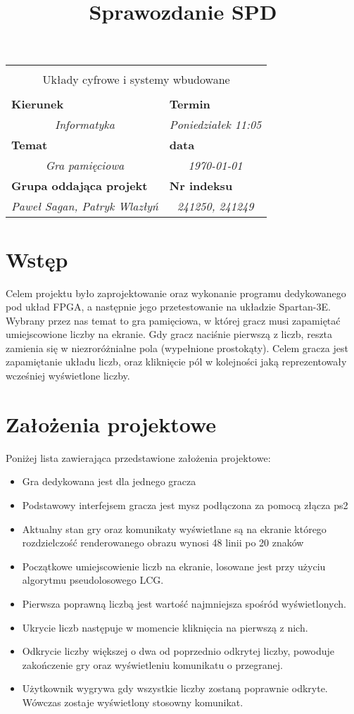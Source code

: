 \documentclass[polish,polish,a4paper]{article}
\title{Sprawozdanie SPD}
\newcommand{\name}[1]{\sffamily\bfseries\scriptsize #1}
\newcommand{\frontpage}[8]{

\vspace{2cm}

\begin{tabular}{|p{0.72\textwidth}|p{0.28\textwidth}|}
\hline
\multicolumn{2}{|c|}{}\\
\multicolumn{2}{|c|}{{\LARGE #1}}\\
\multicolumn{2}{|c|}{}\\
\hline
\name{Kierunek} & \name{Termin}\\
\multicolumn{1}{|c|}{\textit{#2}} & \multicolumn{1}{|c|}{\textit{#3}} \\
\hline
\name{Temat} & \name{data}\\
\multicolumn{1}{|c|}{\textit{#4}} & \multicolumn{1}{|c|}{\textit{#5}} \\
\hline
\name{Grupa oddająca projekt} & \name{Nr indeksu}\\
\multicolumn{1}{|c|}{\textit{#6}} & \multicolumn{1}{|c|}{\textit{#7}} \\
\hline
\end{tabular}
}
\begin{document}
\frontpage{Układy cyfrowe i systemy wbudowane}{Informatyka}{Poniedziałek 11:05}{Gra pamięciowa}{\today}{Paweł Sagan, Patryk Wlazłyń}{241250, 241249}
\pagestyle{}
\newpage
\tableofcontents
\newpage
\section{Wstęp}
Celem projektu było zaprojektowanie oraz wykonanie programu dedykowanego pod układ FPGA, a następnie jego przetestowanie na układzie Spartan-3E.
Wybrany przez nas temat to gra pamięciowa, w której gracz musi zapamiętać umiejscowione liczby na ekranie.
Gdy gracz naciśnie pierwszą z liczb, reszta zamienia się w niezroróżnialne pola (wypełnione prostokąty).
Celem gracza jest zapamiętanie układu liczb, oraz kliknięcie pól w kolejności jaką reprezentowały wcześniej wyświetlone liczby.

\section{Założenia projektowe}
Poniżej lista zawierająca przedstawione założenia projektowe:
\begin{itemize}
  \item Gra dedykowana jest dla jednego gracza
  \item Podstawowy interfejsem gracza jest mysz podłączona za pomocą złącza ps2
  \item Aktualny stan gry oraz komunikaty wyświetlane są na ekranie którego rozdzielczość renderowanego obrazu wynosi 48 linii po 20 znaków
  \item Początkowe umiejscowienie liczb na ekranie, losowane jest przy użyciu algorytmu pseudolosowego LCG.
  \item Pierwsza poprawną liczbą jest wartość najmniejsza spośród wyświetlonych.
  \item Ukrycie liczb następuje w momencie kliknięcia na pierwszą z nich.
  \item Odkrycie liczby większej o dwa od poprzednio odkrytej liczby, powoduje zakończenie gry oraz wyświetleniu komunikatu o przegranej.
  \item Użytkownik wygrywa gdy wszystkie liczby zostaną poprawnie odkryte. Wówczas zostaje wyświetlony stosowny komunikat.
\end{itemize}
\end{document}
